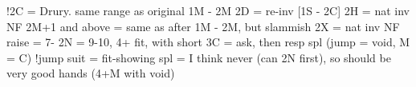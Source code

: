 !2C = Drury. same range as original 1M - 2M
    2D = re-inv
    [1S - 2C] 2H = nat inv NF
    2M+1 and above = same as after 1M - 2M, but slammish
2X = nat inv NF
raise = 7-
2N = 9-10, 4+ fit, with short
    3C = ask, then resp spl (jump = void, M = C)
!jump suit = fit-showing
spl = I think never (can 2N first), so should be very good hands (4+M with void)